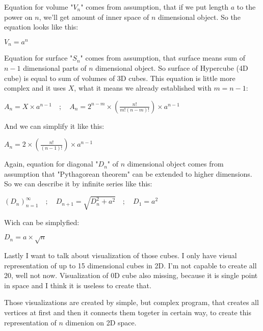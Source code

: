 \documentclass[a4paper,10pt]{article}
\begin{document}
\begin{flushleft}
\vspace{-5pt}
    \null\large{
        \quad Equation for volume "$V_n$" comes from assumption, that if we put length $a$ to the power on $n$, we'll get amount of inner space of $n$ dimensional object.
        So the equation looks like this:} \newline
    \null\centerline{
        \Large{
            $V_n = a^{n}$
        }
    }

\vspace{-5pt}
    \null\large{
        \quad Equation for surface "$S_n$" comes from assumption, that surface means sum of $n-1$ dimensional parts of $n$ dimensional object. So
        surface of Hypercube (4D cube) is equal to sum of volumes of 3D cubes. This equation is little more complex and it uses $X$,
        what it means we already established with $m = n-1$:} \newline
    \null\centerline{
        \Large{
            $A_n = X\times{a^{n-1}}\quad ; \quad A_n = 2^{n-m}\times(\frac{n!}{m!(n-m)!})\times{a^{n-1}}$
        }
    }

\vspace{-5pt}
    \null\large{
        \quad And we can simplify it like this:} \newline
    \null\centerline{
        \Large{
            $A_n = 2\times{(\frac{n!}{(n-1)!})}\times{a^{n-1}}$
        }
    }

    \null\large{
        \quad Again, equation for diagonal "$D_n$" of $n$ dimensional object comes from assumption that "Pythagorean theorem" can be extended
        to higher dimensions. So we can describe it by infinite series like this:} \newline
    \null\centerline{
        \Large{
            $(D_n)^{\infty}_{n=1} \quad ; \quad D_{n+1}=\sqrt{D_n^{2}+a^{2}} \quad ; \quad D_1 = a^{2}$
        }
    }

\vspace{-5pt}
    \null\large{
        \quad Wich can be simplyfied:} \newline
    \null\centerline{
        \Large{
            $D_n = a\times{\sqrt{n}}$
        }
    }

\vspace{-5pt}
    \null\large{
        \quad Lastly I want to talk about visualization of those cubes. I only have visual representation of up to 15 dimensional cubes in 2D.
        I'm not capable to create all 20, well not now. Visualization of 0D cube also missing, because it is single point in space and I think it is
        useless to create that.
    }

\vspace{-5pt}
    \null\large{
        \quad Those visualizations are created by simple, but complex program, that creates all vertices at first and then it connects them togeter in
        certain way, to create this representation of $n$ dimenion on 2D space.
    }

\end{flushleft}
\end{document}
